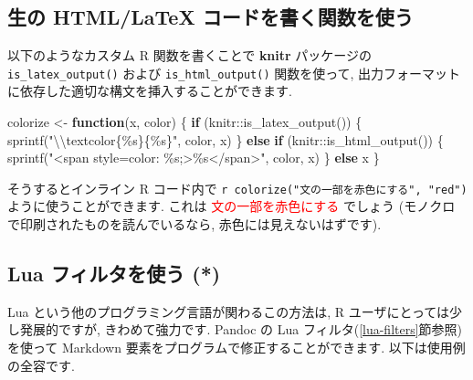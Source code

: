 \documentclass[
  11pt,
  lualatex,
  ja=standard]{bxjsreport}
\newenvironment{Shaded}{\begin{snugshade}}{\end{snugshade}}
\newcommand{\ControlFlowTok}[1]{\textcolor[rgb]{0.13,0.29,0.53}{\textbf{#1}}}
\newcommand{\FunctionTok}[1]{\textcolor[rgb]{0.00,0.00,0.00}{#1}}
\newcommand{\NormalTok}[1]{#1}
\newcommand{\OtherTok}[1]{\textcolor[rgb]{0.56,0.35,0.01}{#1}}
\newcommand{\SpecialCharTok}[1]{\textcolor[rgb]{0.00,0.00,0.00}{#1}}
\newcommand{\StringTok}[1]{\textcolor[rgb]{0.31,0.60,0.02}{#1}}
\begin{document}
\hypertarget{using-an-r-function-to-write-raw-html-or-latex-code}{%
\subsection{生の HTML/LaTeX コードを書く関数を使う}\label{using-an-r-function-to-write-raw-html-or-latex-code}}

以下のようなカスタム R 関数を書くことで \textbf{knitr}  パッケージの \texttt{is\_latex\_output()} および \texttt{is\_html\_output()} 関数を使って, 出力フォーマットに依存した適切な構文を挿入することができます.

\begin{Shaded}
\begin{Highlighting}[numbers=left,,]
\NormalTok{colorize }\OtherTok{\textless{}{-}} \ControlFlowTok{function}\NormalTok{(x, color) \{}
  \ControlFlowTok{if}\NormalTok{ (knitr}\SpecialCharTok{::}\FunctionTok{is\_latex\_output}\NormalTok{()) \{}
    \FunctionTok{sprintf}\NormalTok{(}\StringTok{"}\SpecialCharTok{\textbackslash{}\textbackslash{}}\StringTok{textcolor\{\%s\}\{\%s\}"}\NormalTok{, color, x)}
\NormalTok{  \} }\ControlFlowTok{else} \ControlFlowTok{if}\NormalTok{ (knitr}\SpecialCharTok{::}\FunctionTok{is\_html\_output}\NormalTok{()) \{}
    \FunctionTok{sprintf}\NormalTok{(}\StringTok{"\textless{}span style=\textquotesingle{}color: \%s;\textquotesingle{}\textgreater{}\%s\textless{}/span\textgreater{}"}\NormalTok{, color, }
\NormalTok{      x)}
\NormalTok{  \} }\ControlFlowTok{else}\NormalTok{ x}
\NormalTok{\}}
\end{Highlighting}
\end{Shaded}

そうするとインライン R コード内で \texttt{\textasciigrave{}r\ colorize("文の一部を赤色にする",\ "red")\textasciigrave{}} ように使うことができます. これは \textcolor{red}{文の一部を赤色にする} でしょう (モノクロで印刷されたものを読んでいるなら, 赤色には見えないはずです).

\hypertarget{lua-color}{%
\subsection{Lua フィルタを使う (*)}\label{lua-color}}

Lua という他のプログラミング言語が関わるこの方法は, R ユーザにとっては少し発展的ですが, きわめて強力です. Pandoc の Lua フィルタ(\ref{lua-filters}節参照)を使って Markdown 要素をプログラムで修正することができます. 以下は使用例の全容です.
\end{document}
